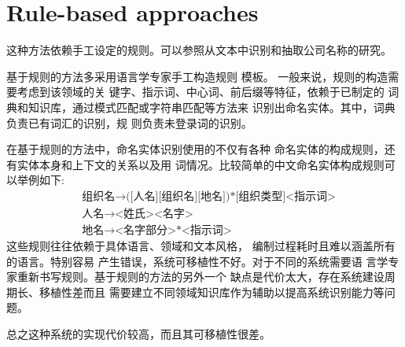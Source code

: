 \documentclass[a4paper,UTF8,no-math]{ctexart}
\begin{document}
	
	\section{Rule-based approaches}
	
	这种方法依赖手工设定的规则。可以参照\citep{rau1991extracting}从文本中识别和抽取公司名称的研究。
	
	基于规则的方法多采用语言学专家手工构造规则
	模板。
	一般来说，规则的构造需要考虑到该领域的关
	键字、指示词、中心词、前后缀等特征，依赖于已制定的
	词典和知识库，通过模式匹配或字符串匹配等方法来
	识别出命名实体。其中，词典负责已有词汇的识别，规
	则负责未登录词的识别。
	
	
	在基于规则的方法中，命名实体识别使用的不仅有各种
	命名实体的构成规则，还有实体本身和上下文的关系以及用
	词情况。比较简单的中文命名实体构成规则可以举例如下:
\begin{align*}
& \text{组织名} \to  \text{([人名][组织名][地名])*[组织类型]<指示词>}\\
& \text{人名} \to  \text{<姓氏><名字>}\\
& \text{地名} \to  \text{<名字部分>*<指示词>}
\end{align*}
	这些规则往往依赖于具体语言、领域和文本风格，
	编制过程耗时且难以涵盖所有的语言。特别容易
	产生错误，系统可移植性不好。对于不同的系统需要语
	言学专家重新书写规则。基于规则的方法的另外一个
	缺点是代价太大，存在系统建设周期长、移植性差而且
	需要建立不同领域知识库作为辅助以提高系统识别能力等问题。
	
	    
	
%	
	
	总之这种系统的实现代价较高，而且其可移植性很差。
	
	\newpage
	
%	
%	
%	
%	
	
\end{document}
